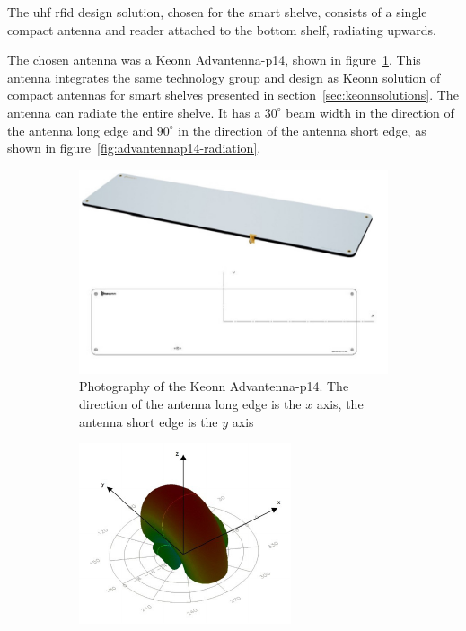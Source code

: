 The \ac{uhf} \ac{rfid} design solution, chosen for the smart shelve, consists of a single compact antenna and reader attached to the bottom shelf, radiating upwards.

The chosen antenna was a Keonn Advantenna-p14, shown in figure~\ref{fig:advantennap14}. This antenna integrates the same technology group and design as Keonn solution of compact antennas for smart shelves presented in section~\ref{sec:keonnsolutions}.
The antenna can radiate the entire shelve. It has a $30^{\circ}$ beam width in the direction of the antenna long edge and $90^{\circ}$ in the direction of the antenna short edge, as shown in figure~\ref{fig:advantennap14-radiation}.

\begin{figure}
    \centering
    \begin{subfigure}{.45\textwidth}
        \centering
        \includegraphics[width=\linewidth]{./figs/advantennap14.pdf}
        \caption{Photography of the Keonn Advantenna-p14. The direction of the antenna long edge is the $x$ axis, the antenna short edge is the $y$ axis} 
        \label{fig:advantennap14}
    \end{subfigure}
    \begin{subfigure}{.45\textwidth}
        \centering
        \includegraphics[width=\linewidth]{./figs/advantennap14-radiation.pdf}

\end{subfigure}
\end{figure}
